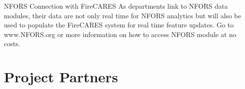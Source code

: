 \documentclass[12pt,oneside]{book}
\begin{document}
NFORS Connection with FireCARES
As departments link to NFORS data modules, their data are not only real time for NFORS analytics but will also be used to populate the FireCARES system for real time feature updates.  Go to www.NFORS.org or more information on how to access NFORS module at no costs.

\chapter{Project Partners}
\end{document}
